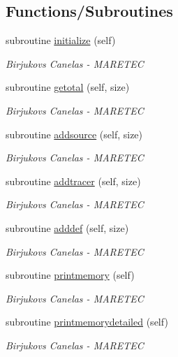 \subsection*{Functions/\+Subroutines}
\begin{DoxyCompactItemize}
\item 
subroutine \hyperlink{namespacesimulation__memory_a3b8f4e0766c90e6d6bd99e2fa49ea91b}{initialize} (self)
\begin{DoxyCompactList}\small\item\em Birjukovs Canelas -\/ M\+A\+R\+E\+T\+EC \end{DoxyCompactList}\item 
subroutine \hyperlink{namespacesimulation__memory_a8589522c4e28cf60741a5439477cdb31}{getotal} (self, size)
\begin{DoxyCompactList}\small\item\em Birjukovs Canelas -\/ M\+A\+R\+E\+T\+EC \end{DoxyCompactList}\item 
subroutine \hyperlink{namespacesimulation__memory_acf01ce7bcb2d7571d37fb2c0338e5bd2}{addsource} (self, size)
\begin{DoxyCompactList}\small\item\em Birjukovs Canelas -\/ M\+A\+R\+E\+T\+EC \end{DoxyCompactList}\item 
subroutine \hyperlink{namespacesimulation__memory_a4d6c8bd027a99cb6c7f9ad2eb55c744f}{addtracer} (self, size)
\begin{DoxyCompactList}\small\item\em Birjukovs Canelas -\/ M\+A\+R\+E\+T\+EC \end{DoxyCompactList}\item 
subroutine \hyperlink{namespacesimulation__memory_a62d5641dbec45bc279575c173b0f0f24}{adddef} (self, size)
\begin{DoxyCompactList}\small\item\em Birjukovs Canelas -\/ M\+A\+R\+E\+T\+EC \end{DoxyCompactList}\item 
subroutine \hyperlink{namespacesimulation__memory_a5827bef8479b809a453af147ceaa8c7c}{printmemory} (self)
\begin{DoxyCompactList}\small\item\em Birjukovs Canelas -\/ M\+A\+R\+E\+T\+EC \end{DoxyCompactList}\item 
subroutine \hyperlink{namespacesimulation__memory_af2a472000acc1ff59cb6e63679617699}{printmemorydetailed} (self)
\begin{DoxyCompactList}\small\item\em Birjukovs Canelas -\/ M\+A\+R\+E\+T\+EC \end{DoxyCompactList}\end{DoxyCompactItemize}
